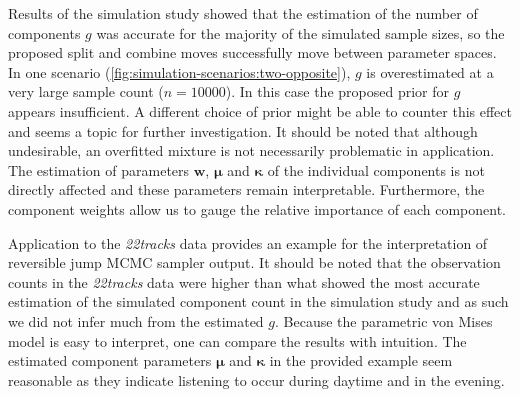 Results of the simulation study showed that the estimation of the number of components $g$ was accurate for the majority of the simulated sample sizes, so the proposed split and combine moves successfully move between parameter spaces. In one scenario (\ref{fig:simulation-scenarios:two-opposite}), $g$ is overestimated at a very large sample count ($n=10000$). In this case the proposed prior for $g$ appears insufficient. A different choice of prior might be able to counter this effect and seems a topic for further investigation. It should be noted that although undesirable, an overfitted mixture is not necessarily problematic in application. The estimation of parameters $\bm w$, $\bm \mu$ and $\bm \kappa$ of the individual components is not directly affected and these parameters remain interpretable. Furthermore, the component weights allow us to gauge the relative importance of each component.


Application to the \textit{22tracks} data provides an example for the interpretation of reversible jump MCMC sampler output. It should be noted that the observation counts in the \textit{22tracks} data were higher than what showed the most accurate estimation of the simulated component count in the simulation study and as such we did not infer much from the estimated $g$. Because the parametric von Mises model is easy to interpret, one can compare the results with intuition. The estimated component parameters $\bm \mu$ and $\bm \kappa$ in the provided example seem reasonable as they indicate listening to occur during daytime and in the evening. 


